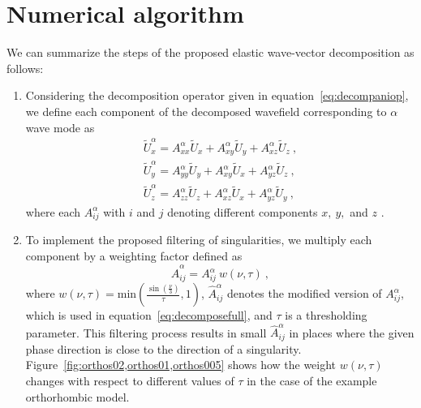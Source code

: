 \section{Numerical algorithm}
We can summarize the steps of the proposed elastic wave-vector decomposition as follows:
\begin{enumerate}[leftmargin=*]
\item   Considering the decomposition operator given in equation~\ref{eq:decompaniop}, we define each component of the decomposed wavefield corresponding to $\alpha$ wave mode as
\begin{eqnarray}
\label{eq:decomposefull}
    \widetilde{U}^{\alpha}_x = A^{\alpha}_{xx} \widetilde{U}_x + A^{\alpha}_{xy}\widetilde{U}_y + A^{\alpha}_{xz} \widetilde{U}_z~,\\
    \nonumber
    \widetilde{U}^{\alpha}_y = A^{\alpha}_{yy} \widetilde{U}_y + A^{\alpha}_{xy} \widetilde{U}_x + A^{\alpha}_{yz} \widetilde{U}_z~,\\
    \nonumber
    \widetilde{U}^{\alpha}_{z} = A^{\alpha}_{zz} \widetilde{U}_z + A^{\alpha}_{xz} \widetilde{U}_x + A^{\alpha}_{yz} \widetilde{U}_y~,
\end{eqnarray}
where each $A^{\alpha}_{ij}$ with $i$ and $j$ denoting different components $x,~y,$ and $z$ .
\item To implement the proposed filtering of singularities, we multiply each component by a weighting factor defined as
\begin{equation}
\label{eq:weight}
\hat{A}^{\alpha}_{ij} = A^{\alpha}_{ij}~w(\nu,\tau)~,
\end{equation}
where $w(\nu,\tau) = \mbox{min} \left(\frac{\sin(\frac{\nu}{3})}{\tau},1 \right)$, $\hat{A}^{\alpha}_{ij}$ denotes the modified version of $A^{\alpha}_{ij}$, which is used in equation~\ref{eq:decomposefull}, and $\tau$ is a thresholding parameter. This filtering process results in small $\hat{A}^{\alpha}_{ij}$ in places where the given phase direction  is close to the direction of a singularity. Figure~\ref{fig:orthos02,orthos01,orthos005} shows how the weight $w(\nu,\tau)$ changes with respect to different values of $\tau$ in the case of the example orthorhombic model.



\end{enumerate}
